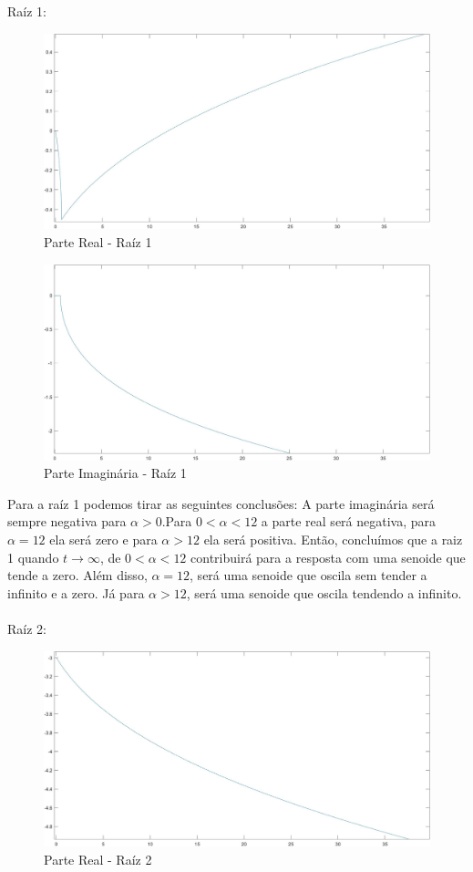 \documentclass[a4paper,12pt,twoside]{article}
\begin{document}
Raíz  1:
\begin{figure}[H]
\centering
\includegraphics[scale=0.2]{real1.jpg}
\caption{Parte Real - Raíz 1}
\label{fig:real1}
\end{figure}
\begin{figure}[H]
\centering
\includegraphics[scale=0.2]{img1.jpg}
\caption{Parte Imaginária - Raíz 1}
\label{fig:real1}
\end{figure}
Para a raíz 1 podemos tirar as seguintes conclusões:
A parte imaginária será sempre negativa para $\alpha>0$.Para $0<\alpha<12$ a parte real será negativa, para $\alpha=12$ ela será zero e para $\alpha>12$ ela será positiva. Então, concluímos que a raiz 1 quando $t\rightarrow \infty$, de $0<\alpha<12$ contribuirá para a resposta com uma senoide que tende a zero. Além disso, $\alpha=12$, será uma senoide que oscila sem tender a infinito e a zero. Já para $\alpha>12$, será uma senoide que oscila tendendo a infinito.
\\
\\
Raíz  2:
\begin{figure}[H]
\centering
\includegraphics[scale=0.2]{real2.jpg}
\caption{Parte Real - Raíz 2}
\label{fig:real2}
\end{figure}
\end{document}
